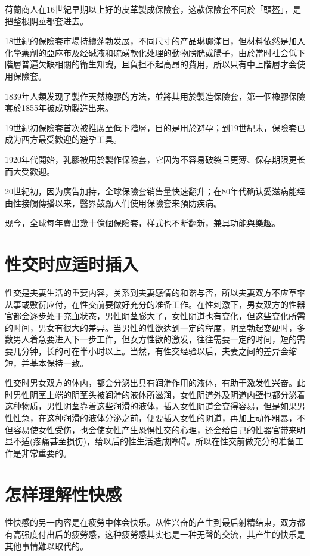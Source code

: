 \documentclass[12pt,UTF8]{ctexbook}
\begin{document}
荷蘭商人在16世紀早期以上好的皮革製成保險套，这款保險套不同於「頭盔」，是把整根阴莖都套进去。

18世紀的保險套市場持續蓬勃发展，不同尺寸的产品琳瑯滿目，但材料依然是加入化學藥劑的亞麻布及经碱液和硫磺軟化处理的動物膀胱或腸子，由於當时社会低下階層普遍欠缺相關的衛生知識，且負担不起高昂的費用，所以只有中上階層才会使用保險套。

1839年人類发现了製作天然橡膠的方法，並將其用於製造保險套，第一個橡膠保險套於1855年被成功製造出来。

19世紀初保險套首次被推廣至低下階層，目的是用於避孕；到19世紀末，保險套已成为西方最受歡迎的避孕工具。

1920年代開始，乳膠被用於製作保險套，它因为不容易破裂且更薄、保存期限更长而大受歡迎。

20世紀初，因为廣告加持，全球保險套销售量快速翻升；在80年代确认愛滋病能经由性接觸傳播以来，醫界鼓勵人们使用保險套来預防疾病。

现今，全球每年賣出幾十億個保險套，样式也不断翻新，兼具功能與樂趣。



\section{性交时应适时插入}

性交是夫妻生活的重要内容，关系到夫妻感情的和谐与否，所以夫妻双方不应草率从事或敷衍应付，在性交前要做好充分的准备工作。在性刺激下，男女双方的性器官都会逐步处于充血状态，男性阴茎膨大了，女性阴道也有变化，但这些变化所需的时间，男女有很大的差异。当男性的性欲达到一定的程度，阴茎勃起变硬时，多数男人着急要进入下一步工作，但女方性欲的激发，往往需要一定的时间，短的需要几分钟，长的可在半小时以上。当然，有性交经验以后，夫妻之间的差异会缩短，并基本保持一致。

性交时男女双方的体内，都会分泌出具有润滑作用的液体，有助于激发性兴奋。此时男性阴茎上端的阴茎头被润滑的液体所滋润，女性阴道外及阴道内壁也都分泌着这种物质，男性阴茎靠着这些润滑的液体，插入女性阴道会变得容易，但是如果男性性急，在这种润滑的液体分泌之前，便要插入女性的阴道，再加上动作粗暴，不但容易使女性受伤，也会使女性产生恐惧性交的心理，还会给自己的性器官带来明显不适(疼痛甚至损伤)，给以后的性生活造成障碍。所以在性交前做充分的准备工作是非常重要的。

\section{怎样理解性快感}

性快感的另一内容是在疲勞中体会快乐。从性兴奋的产生到最后射精结束，双方都有高强度付出后的疲勞感，这种疲勞感其实也是一种无聲的交流，其产生的快乐是其他事情難以取代的。
\end{document}
